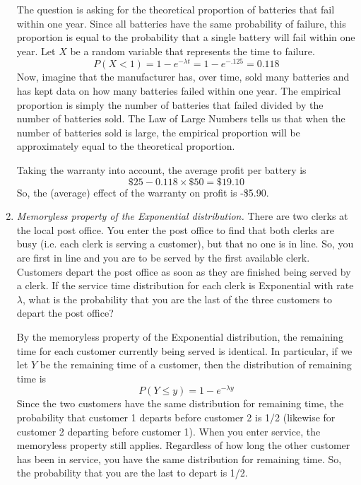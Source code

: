 \begin{enumerate}
\begin{solution}
  \bs The question is asking for the theoretical proportion of
  batteries that fail within one year. Since all batteries have the
  same probability of failure, this proportion is equal to the
  probability that a single battery will fail within one year. Let $X$
  be a random variable that represents the time to failure.
\[ P(X<1) = 1-e^{-\lambda t} = 1 - e^{-.125} = 0.118 \]
Now, imagine that the manufacturer has, over time,
  sold many batteries and has kept data on how many batteries failed
  within one year. The empirical proportion is simply the number
  of batteries that failed divided by the number of batteries sold.
  The Law of Large Numbers tells us that when the number of batteries
  sold is large, the empirical proportion will be approximately
  equal to the theoretical proportion.

Taking the warranty into account, the average profit per battery is
\[ \$25 - 0.118\times \$50 = \$19.10 \]
So, the (average) effect of the warranty on profit is -\$5.90.
\end{solution}

\item \emph{Memoryless property of the Exponential distribution.}
  There are two clerks at the local post office. You enter the post
  office to find that both clerks are busy (i.e. each clerk is serving
  a customer), but that no one is in line.  So, you are first in line
  and you are to be served by the first available clerk. Customers
  depart the post office as soon as they are finished being served by
  a clerk. If the service time distribution for each clerk is
  Exponential with rate $\lambda$, what is the probability that you
  are the last of the three customers to depart the post office?

\begin{solution}
\bs
By the memoryless property of the Exponential distribution, the
remaining time for each customer currently being served is identical.
In particular, if we let $Y$ be the remaining time of a customer, then
the distribution of remaining time is
\[ P(Y \leq y) = 1 - e^{-\lambda y} \] Since the two customers have
the same distribution for remaining time, the probability that
customer 1 departs before customer 2 is 1/2 (likewise for
customer 2 departing before customer 1). When you enter service, the
memoryless property still applies.  Regardless of how long the
other customer has been in service, you have the same distribution
for remaining time. So, the probability that you are the last to depart
is 1/2.
\end{solution}


\end{enumerate}
